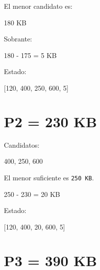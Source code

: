 \documentclass[
  spanish,
  letterpaper,
]{scrbook}
\newenvironment{Shaded}{\begin{snugshade}}{\end{snugshade}}
\newcommand{\NormalTok}[1]{\textcolor[rgb]{0.00,0.23,0.31}{#1}}
\begin{document}
El menor candidato es:

\begin{Shaded}
\begin{Highlighting}[]
\NormalTok{180 KB}
\end{Highlighting}
\end{Shaded}

Sobrante:

\begin{Shaded}
\begin{Highlighting}[]
\NormalTok{180 {-} 175 = 5 KB}
\end{Highlighting}
\end{Shaded}

Estado:

\begin{Shaded}
\begin{Highlighting}[]
\NormalTok{[120, 400, 250, 600, 5]}
\end{Highlighting}
\end{Shaded}

\section{P2 = 230 KB}\label{p2-230-kb-1}

Candidatos:

\begin{Shaded}
\begin{Highlighting}[]
\NormalTok{400, 250, 600}
\end{Highlighting}
\end{Shaded}

El menor suficiente es \texttt{250\ KB}.

\begin{Shaded}
\begin{Highlighting}[]
\NormalTok{250 {-} 230 = 20 KB}
\end{Highlighting}
\end{Shaded}

Estado:

\begin{Shaded}
\begin{Highlighting}[]
\NormalTok{[120, 400, 20, 600, 5]}
\end{Highlighting}
\end{Shaded}

\section{P3 = 390 KB}\label{p3-390-kb-1}
\end{document}
